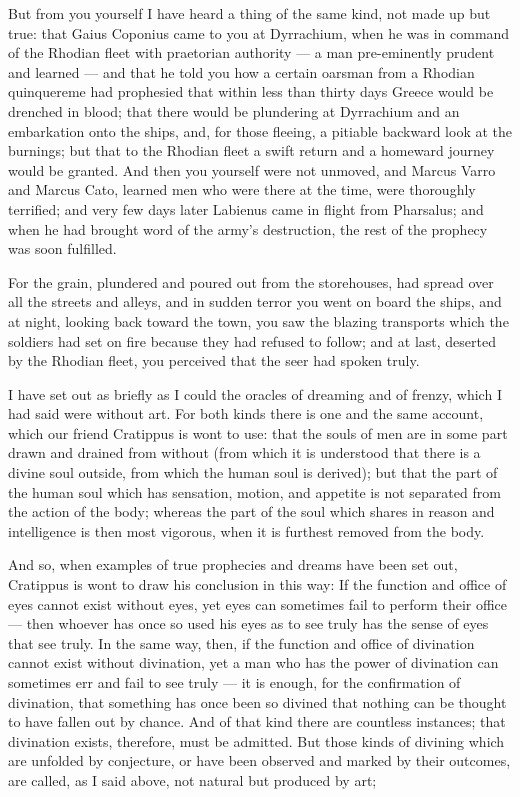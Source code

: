  But from you yourself I have heard a thing of the same kind, not made up but true: that Gaius Coponius came to you at Dyrrachium, when he was in command of the Rhodian fleet with praetorian authority — a man pre-eminently prudent and learned — and that he told you how a certain oarsman from a Rhodian quinquereme had prophesied that within less than thirty days Greece would be drenched in blood; that there would be plundering at Dyrrachium and an embarkation onto the ships, and, for those fleeing, a pitiable backward look at the burnings; but that to the Rhodian fleet a swift return and a homeward journey would be granted. And then you yourself were not unmoved, and Marcus Varro and Marcus Cato, learned men who were there at the time, were thoroughly terrified; and very few days later Labienus came in flight from Pharsalus; and when he had brought word of the army's destruction, the rest of the prophecy was soon fulfilled.

 For the grain, plundered and poured out from the storehouses, had spread over all the streets and alleys, and in sudden terror you went on board the ships, and at night, looking back toward the town, you saw the blazing transports which the soldiers had set on fire because they had refused to follow; and at last, deserted by the Rhodian fleet, you perceived that the seer had spoken truly.

 I have set out as briefly as I could the oracles of dreaming and of frenzy, which I had said were without art. For both kinds there is one and the same account, which our friend Cratippus is wont to use: that the souls of men are in some part drawn and drained from without (from which it is understood that there is a divine soul outside, from which the human soul is derived); but that the part of the human soul which has sensation, motion, and appetite is not separated from the action of the body; whereas the part of the soul which shares in reason and intelligence is then most vigorous, when it is furthest removed from the body.

 And so, when examples of true prophecies and dreams have been set out, Cratippus is wont to draw his conclusion in this way: If the function and office of eyes cannot exist without eyes, yet eyes can sometimes fail to perform their office — then whoever has once so used his eyes as to see truly has the sense of eyes that see truly. In the same way, then, if the function and office of divination cannot exist without divination, yet a man who has the power of divination can sometimes err and fail to see truly — it is enough, for the confirmation of divination, that something has once been so divined that nothing can be thought to have fallen out by chance. And of that kind there are countless instances; that divination exists, therefore, must be admitted. But those kinds of divining which are unfolded by conjecture, or have been observed and marked by their outcomes, are called, as I said above, not natural but produced by art;

